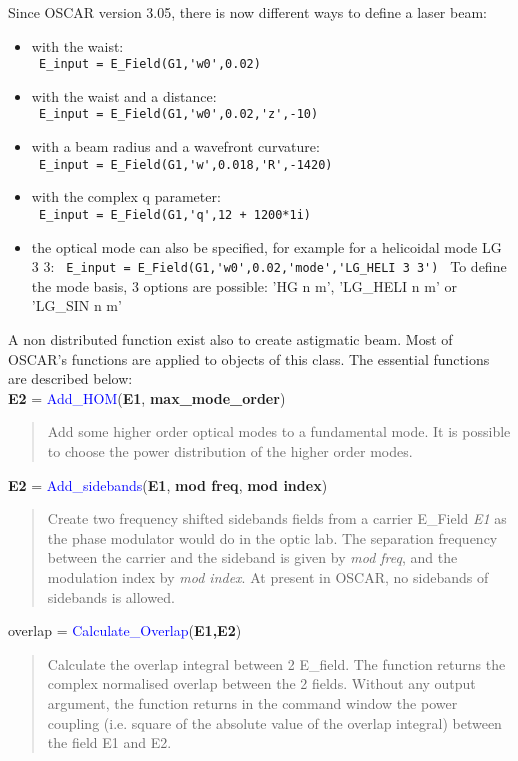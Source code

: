 Since OSCAR version 3.05, there is now different ways to define a laser beam:
\begin{itemize}
  \item with the waist: \\
        \verb? E_input = E_Field(G1,'w0',0.02) ?
  \item with the waist and a distance: \\
        \verb? E_input = E_Field(G1,'w0',0.02,'z',-10) ?
  \item with a beam radius and a wavefront curvature: \\
        \verb? E_input = E_Field(G1,'w',0.018,'R',-1420) ?
  \item with the complex q parameter: \\
        \verb? E_input = E_Field(G1,'q',12 + 1200*1i) ?
  \item the optical mode can also be specified, for example for a helicoidal mode LG 3 3:
        \verb? E_input = E_Field(G1,'w0',0.02,'mode','LG_HELI 3 3') ?
        To define the mode basis, 3 options are possible: 'HG n m', 'LG\_HELI n m' or 'LG\_SIN n m'
\end{itemize}
A non distributed function exist also to create astigmatic beam. Most of OSCAR's functions are applied to objects of this class. The essential functions are described below:\\

\noindent \textbf{E2} = \textcolor{blue}{Add\_HOM}(\textbf{E1}, \textbf{max\_mode\_order})
\vspace*{-0.2cm}
\begin{quote}
Add some higher order optical modes to a fundamental mode. It is possible to choose the power distribution of the higher order modes.
\end{quote}

\noindent \textbf{E2} = \textcolor{blue}{Add\_sidebands}(\textbf{E1}, \textbf{mod freq}, \textbf{mod index})
\vspace*{-0.2cm}
\begin{quote}
Create two frequency shifted sidebands fields from a carrier E\_Field \textsl{E1} as the phase modulator would do in the optic lab. The separation frequency between the carrier and the sideband is given by \textsl{mod freq}, and the modulation index by \textsl{mod index}. At present in OSCAR, no sidebands of sidebands is allowed.
\end{quote}

\noindent overlap = \textcolor{blue}{Calculate\_Overlap}(\textbf{E1,E2})
\vspace*{-0.2cm}
\begin{quote}
Calculate the overlap integral between 2 E\_field. The function returns the complex normalised overlap between the 2 fields. Without any output argument, the function returns in the command window the power coupling (i.e. square of the absolute value of the overlap integral) between the field E1 and E2.
\end{quote}

